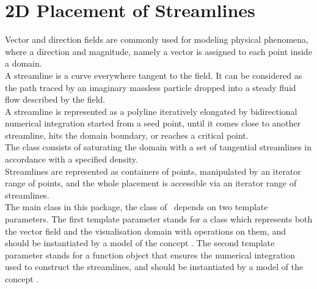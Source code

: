 
\chapter{2D Placement of Streamlines}
\label{ref_chapter_2D_Streamlines}




Vector and direction fields are commonly used for modeling physical
phenomena, where a direction and magnitude, namely a vector is assigned to
each point inside a domain.\\

A streamline is a curve everywhere tangent to the field. It can be
considered as the path traced by an imaginary massless particle
dropped into a steady fluid flow described by the field.\\

A streamline is represented as a polyline iteratively elongated by
bidirectional numerical integration started from a seed point, until
it comes close to another streamline, hits the domain boundary, or
reaches a critical point.\\

The  class consists of saturating the domain with
a set of tangential streamlines in accordance with a specified
density.\\

Streamlines are represented as containers of points, manipulated by an
iterator range of points, and the whole placement is accessible via an
iterator range of streamlines.\\

The main class in this package, the  class of \cgal\ depends on two template
parameters.  The first template parameter stands for a class which
represents both the vector field and the visualisation domain with
operations on them, and should be instantiated by a model of the concept
.  The second template parameter stands for a
function object that ensures the numerical integration used to
construct the streamlines, and should be instantiated by a model of the concept
.

